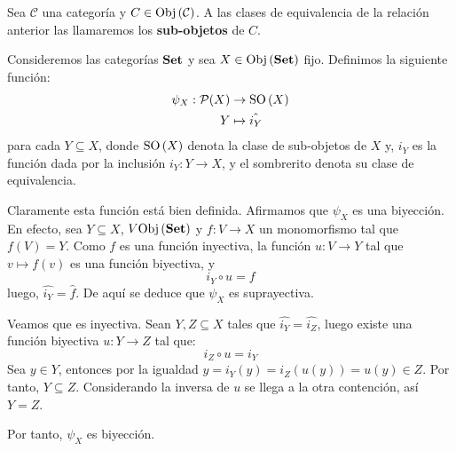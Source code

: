 \documentclass[12pt]{report}
\theoremstyle{largebreak}
\newcommand\cf[3]{\ensuremath{#1:#2\rightarrow#3}}
\newcommand{\Obj}[1]{\ensuremath{\textup{Obj}\left(#1\right)}}
\newcommand{\Cat}[1]{\ensuremath{\textup{\textbf{#1}}}}
\newcommand{\SO}[1]{\ensuremath{\textup{SO}\left(#1\right)}}
\begin{document}
    \begin{mydef}
        Sea $\mathcal{C}$ una categoría y $C\in\Obj{\mathcal{C}}$. A las clases de equivalencia de la relación anterior las llamaremos los \textbf{sub-objetos} de $C$.
    \end{mydef}

    \begin{exa}
        Consideremos las categorías $\Cat{Set}$ y sea $X\in\Obj{\Cat{Set}}$ fijo. Definimos la siguiente función:
        \begin{equation*}
            \begin{split}
                \psi_X:\mathcal{P}(X)&\rightarrow \SO{X}\\
                Y&\mapsto \hat{i_Y}\\
            \end{split}
        \end{equation*}
        para cada $Y\subseteq X$, donde $\SO{X}$ denota la clase de sub-objetos de $X$ y, $i_Y$ es la función dada por la inclusión $\cf{i_Y}{Y}{X}$, y el sombrerito denota su clase de equivalencia.
    \end{exa}

    \begin{sol}
        Claramente esta función está bien definida. Afirmamos que $\psi_X$ es una biyección. En efecto, sea $Y\subseteq X$, $V\Obj{\Cat{Set}}$ y $\cf{f}{V}{X}$ un monomorfismo tal que $f(V)=Y$. Como $f$ es una función inyectiva, la función $\cf{u}{V}{Y}$ tal que $v\mapsto f(v)$ es una función biyectiva, y
        \begin{equation*}
            i_Y\circ u=f
        \end{equation*}
        luego, $\hat{i_Y}=\hat{f}$. De aquí se deduce que $\psi_X$ es suprayectiva.

        Veamos que es inyectiva. Sean $Y,Z\subseteq X$ tales que $\hat{i_Y}=\hat{i_Z}$, luego existe una función biyectiva $\cf{u}{Y}{Z}$ tal que:
        \begin{equation*}
            i_Z\circ u = i_Y
        \end{equation*}
        Sea $y\in Y$, entonces por la igualdad $y=i_Y(y)=i_Z(u(y))=u(y)\in Z$. Por tanto, $Y\subseteq Z$. Considerando la inversa de $u$ se llega a la otra contención, así $Y=Z$.

        Por tanto, $\psi_X$ es biyección.
    \end{sol}
\end{document}
